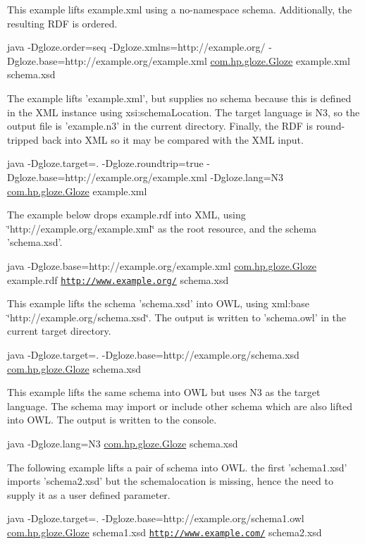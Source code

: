 This example lifts example.xml using a no-\/namespace schema. Additionally, the resulting RDF is ordered.

{\ttfamily java -\/Dgloze.order=seq -\/Dgloze.xmlns=http://example.org/ -\/Dgloze.base=http://example.org/example.xml \hyperlink{classcom_1_1hp_1_1gloze_1_1_gloze}{com.hp.gloze.Gloze} example.xml schema.xsd}

The example lifts 'example.xml', but supplies no schema because this is defined in the XML instance using xsi:schemaLocation. The target language is N3, so the output file is 'example.n3' in the current directory. Finally, the RDF is round-\/tripped back into XML so it may be compared with the XML input.

{\ttfamily java -\/Dgloze.target=. -\/Dgloze.roundtrip=true -\/Dgloze.base=http://example.org/example.xml -\/Dgloze.lang=N3 \hyperlink{classcom_1_1hp_1_1gloze_1_1_gloze}{com.hp.gloze.Gloze} example.xml}

The example below drops example.rdf into XML, using \char`\"{}http://example.org/example.xml\char`\"{} as the root resource, and the schema 'schema.xsd'.

{\ttfamily java -\/Dgloze.base=http://example.org/example.xml \hyperlink{classcom_1_1hp_1_1gloze_1_1_gloze}{com.hp.gloze.Gloze} example.rdf \href{http://www.example.org/}{\tt http://www.example.org/} schema.xsd}

This example lifts the schema 'schema.xsd' into OWL, using xml:base \char`\"{}http://example.org/schema.xsd\char`\"{}. The output is written to 'schema.owl' in the current target directory.

{\ttfamily java -\/Dgloze.target=. -\/Dgloze.base=http://example.org/schema.xsd \hyperlink{classcom_1_1hp_1_1gloze_1_1_gloze}{com.hp.gloze.Gloze} schema.xsd}

This example lifts the same schema into OWL but uses N3 as the target language. The schema may import or include other schema which are also lifted into OWL. The output is written to the console.

{\ttfamily java -\/Dgloze.lang=N3 \hyperlink{classcom_1_1hp_1_1gloze_1_1_gloze}{com.hp.gloze.Gloze} schema.xsd}

The following example lifts a pair of schema into OWL. the first 'schema1.xsd' imports 'schema2.xsd' but the schemalocation is missing, hence the need to supply it as a user defined parameter.

{\ttfamily java -\/Dgloze.target=. -\/Dgloze.base=http://example.org/schema1.owl \hyperlink{classcom_1_1hp_1_1gloze_1_1_gloze}{com.hp.gloze.Gloze} schema1.xsd \href{http://www.example.com/}{\tt http://www.example.com/} schema2.xsd}

